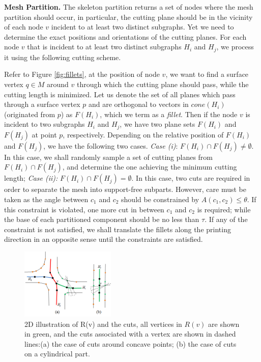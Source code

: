 \textbf{Mesh Partition.} The skeleton partition returns a set of nodes where the mesh partition should occur, in particular, the cutting plane should be in the vicinity of each node $v$ incident to at least two distinct subgraphs. Yet we need to determine the exact positions and orientations of the cutting planes. For each node $v$ that is incident to at least two distinct subgraphs $H_i$ and $H_j$, we process it using the following cutting scheme.


Refer to Figure \ref{fig:fillets}, at the position of node $v$, we want to find a surface vertex $q \in M$ around $v$ through which the cutting plane should pass, while the cutting length is minimized. Let us denote the set of all planes which pass through a surface vertex $p$ and are orthogonal to vectors in $cone(H_i)$ (originated from $p$)  as $F(H_i)$, which we term as a \emph{fillet}. Then if the node $v$ is incident to two subgraphs $H_i$ and $H_j$, we have two plane sets $F(H_i)$ and $F(H_j)$ at point $p$, respectively. Depending on the relative position of $F(H_i)$ and $F(H_j)$, we have the following two cases. \emph{Case (i)}: $F(H_i) \cap F(H_j) \neq \emptyset$. In this case, we shall randomly sample a set of cutting planes from $F(H_i) \cap F(H_j)$, and determine the one achieving the minimum cutting length; \emph{Case (ii):} $F(H_i) \cap F(H_j) = \emptyset$. In this case, two cuts are required in order to separate the mesh into support-free subparts. However, care must be taken as the angle between $c_1$ and $c_2$ should be constrained by $A(c_1, c_2) \leq \theta$. If this constraint is violated, one more cut in between $c_1$ and $c_2$ is required; while the base of each partitioned component should be no less than $\tau$. If any of the constraint is not satisfied, we shall translate the fillets along the printing direction in an opposite sense until the constraints are satisfied.

\begin{figure}[tbp]
  \centering
  \includegraphics[width=0.4\textwidth]{figs/forward_tracing.png}
  \caption{\label{fig:forward_tracing}%
           2D illustration of R(v) and the cuts, all vertices in $R(v)$ are shown in green, and the cuts associated with a vertex are shown in dashed lines:(a) the case of cuts around concave points; (b) the case of cuts on a cylindrical part.}
\end{figure}

